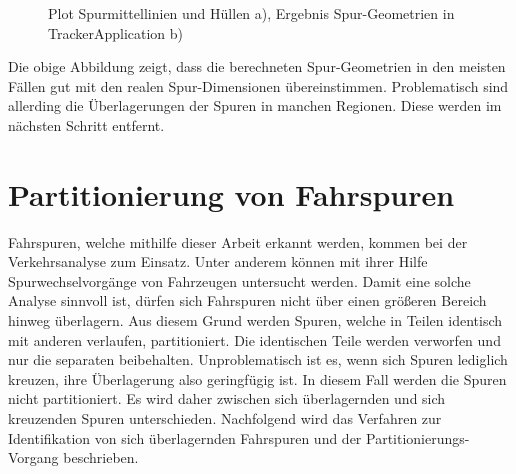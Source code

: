 \begin{figure}[H]
    \centering
    \qquad
    \caption{Plot Spurmittellinien und Hüllen a), Ergebnis Spur-Geometrien in TrackerApplication b)}
    \label{fig:real2_results_geometry_definition}
\end{figure}

Die obige Abbildung zeigt, dass die berechneten Spur-Geometrien in den meisten Fällen gut mit den realen
Spur-Dimensionen übereinstimmen. Problematisch sind allerding die Überlagerungen der Spuren in manchen
Regionen. Diese werden im nächsten Schritt entfernt.

\section{Partitionierung von Fahrspuren}
\label{sec:real2_lane_partitioning}

Fahrspuren, welche mithilfe dieser Arbeit erkannt werden, kommen bei der Verkehrsanalyse zum Einsatz.
Unter anderem können mit ihrer Hilfe Spurwechselvorgänge von Fahrzeugen untersucht werden. Damit eine
solche Analyse sinnvoll ist, dürfen sich Fahrspuren nicht über einen größeren Bereich hinweg überlagern.
Aus diesem Grund werden Spuren, welche in Teilen identisch mit anderen verlaufen, partitioniert. Die
identischen Teile werden verworfen und nur die separaten beibehalten.
Unproblematisch ist es, wenn sich Spuren lediglich kreuzen, ihre Überlagerung also geringfügig ist.
In diesem Fall werden die Spuren nicht partitioniert. Es wird daher zwischen sich überlagernden und sich
kreuzenden Spuren unterschieden. Nachfolgend wird das Verfahren
zur Identifikation von sich überlagernden Fahrspuren und der Partitionierungs-Vorgang beschrieben.

